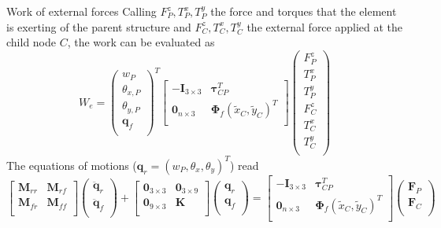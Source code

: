 \documentclass{beamer}
\begin{document}
\begin{frame}{Work of external forces}
	Calling $F_P^z, T_P^x, T_P^y$ the force and torques that the element is exerting of the parent structure and $F_C^z, T_C^x, T_C^y$ the external force applied at the child node $C$, the work can be evaluated as
	\begin{equation*}
	W_e = \begin{pmatrix}
	w_P \\
	\theta_{x, P} \\
	\theta_{y, P} \\
	\bm{q}_f \\
	\end{pmatrix}^T
	\begin{bmatrix}
	- \bm{I}_{3 \times 3} & \bm{\tau}_{CP}^T \\
	\bm{0}_{n \times 3}   & \bm\Phi_f(\widetilde{x}_C, \widetilde{y}_C)^T	\\
	\end{bmatrix}\begin{pmatrix}
	F_P^z \\
	T_P^x \\
	T_P^y \\
	F_C^z \\
	T_C^x \\
	T_C^y \\
	\end{pmatrix}
	\end{equation*}
	The equations of motions ($\bm{q}_r = (w_P,	\theta_{x}, \theta_{y} )^T$) read
	\begin{equation*}
		\begin{bmatrix}
		\bm{M}_{rr} & \bm{M}_{rf}\\
		\bm{M}_{fr} & \bm{M}_{ff}\\
		\end{bmatrix}
		\begin{pmatrix}
		\ddot{\bm{q}}_{r}\\
		\ddot{\bm{q}}_{f}\\
		\end{pmatrix} + 
		\begin{bmatrix}
		\bm{0}_{3 \times 3} & \bm{0}_{3 \times 9}\\
		\bm{0}_{9 \times 3} & \bm{K}\\
		\end{bmatrix}
		\begin{pmatrix}
		{\bm{q}}_{r}\\
		{\bm{q}}_{f}\\
		\end{pmatrix} = 
		\begin{bmatrix}
		- \bm{I}_{3 \times 3} & \bm{\tau}_{CP}^T \\
		\bm{0}_{n \times 3}   & \bm\Phi_f(\widetilde{x}_C, \widetilde{y}_C)^T	\\
		\end{bmatrix}\begin{pmatrix}
		\bm{F}_P\\
		\bm{F}_C\\
		\end{pmatrix}
	\end{equation*}
\end{frame}
\end{document}
